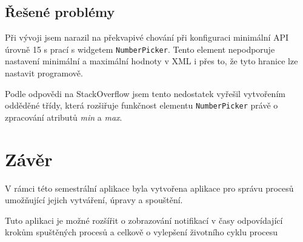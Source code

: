 \documentclass[12pt,a4paper]{article}
\let\oldsection\section
\renewcommand\section{\clearpage\oldsection}
\begin{document}
\subsection{Řešené problémy}
Při vývoji jsem narazil na překvapivé chování při konfiguraci minimální API úrovně 15 s prací s widgetem \texttt{NumberPicker}. Tento element nepodporuje nastavení minimální a maximální hodnoty v XML i přes to, že tyto hranice lze nastavit programově.

Podle odpovědi na StackOverflow jsem tento nedostatek vyřešil vytvořením odděděné třídy, která rozšiřuje funkčnost elementu \texttt{NumberPicker} právě o zpracování atributů \textit{min} a \textit{max}.

\section{Závěr}
V rámci této semestrální aplikace byla vytvořena aplikace pro správu procesů umožňující jejich vytváření, úpravy a spouštění.

Tuto aplikaci je možné rozšířit o zobrazování notifikací v časy odpovídající krokům spuštěných procesů a celkově o vylepšení životního cyklu procesu


\end{document}
